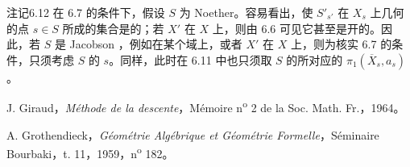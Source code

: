 \begin{SGAresult}{注记}{6.12}
在 6.7 的条件下，假设 $S$ 为 Noether。容易看出，使 $S'_{s'}$ 在 $X_s$ 上几何的点 $s\in S$ 所成的集合是的；若 $X'$ 在 $X$ 上，则由 6.6 可见它甚至是开的。因此，若 $S$ 是 Jacobson ，例如在某个域上，或者 $X'$ 在 $X$ 上，则为核实 6.7 的条件，只须考虑 $S$ 的 $s$。同样，此时在 6.11 中也只须取 $S$ 的所对应的 $\pi_1(\overline X_s,a_s)$。
\end{SGAresult}

\begin{description}[leftmargin=2.5em,labelwidth=2em]
\item[{[D]}] J. Giraud，\textit{Méthode de la descente}，Mémoire n\textsuperscript{o} 2 de la Soc. Math. Fr.，1964。
\item[{[1]}] A. Grothendieck，\textit{Géométrie Algébrique et Géométrie Formelle}，Séminaire Bourbaki，t. 11，1959，n\textsuperscript{o} 182。
\end{description}
